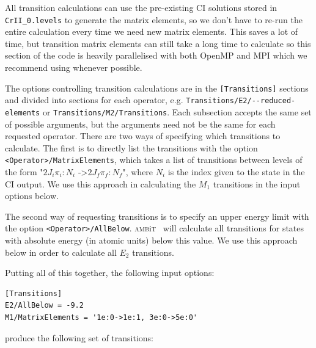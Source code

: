 \documentclass{report}
\newcommand{\ambit}{\textsc{amb}{\footnotesize i}\textsc{t}}
\begin{document}
All transition calculations can use the pre-existing CI solutions stored in \texttt{CrII\_0.levels} to 
generate the matrix elements, so we don't have to re-run the entire calculation every time we need new
matrix elements. This saves a lot of time, but transition matrix elements can still take a long time to
calculate so this section of the code is heavily parallelised with both OpenMP and MPI which we
recommend using whenever possible.

The options controlling transition calculations are in the \texttt{[Transitions]} sections and divided
into sections for each operator, e.g. \texttt{Transitions/E2/{-}{-}reduced-elements} or 
\texttt{Transitions/M2/Transitions}. Each subsection accepts the same set of possible arguments, but 
the arguments need not be the same for each requested operator. There are two ways of specifying which
transitions to calculate. The first is to directly list the transitions with the option
\texttt{<Operator>/MatrixElements}, which takes a list of transitions between levels of the form
"$2J_i\pi_i:N_i$ -\textgreater $2J_f\pi_f:N_f$", where $N_i$ is the index given to the state in the CI
output. We use this approach in calculating the $M_1$ transitions in the input options below.

The second way of requesting transitions is to specify an upper energy limit with the option
\texttt{<Operator>/AllBelow}. \ambit~ will calculate all transitions for states with absolute energy (in
atomic units) below this value. We use this approach below in order to calculate all $E_{2}$ 
transitions.

Putting all of this together, the following input options:

\begin{verbatim}
[Transitions]                                                                  
E2/AllBelow = -9.2                                                                
M1/MatrixElements = '1e:0->1e:1, 3e:0->5e:0'
\end{verbatim}

produce the following set of transitions:
\end{document}
